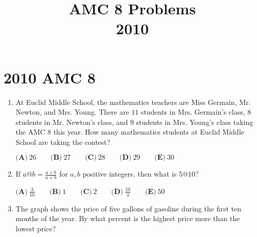 \documentclass{article}
\title{AMC 8 Problems \\ 2010}
\date{}
\begin{document}
\maketitle\thispagestyle{fancy}\newpage\section*{2010 AMC 8}\begin{enumerate}[label=\arabic*., itemsep=0.5em]\item At Euclid Middle School, the mathematics teachers are Miss Germain, Mr. Newton, and Mrs. Young. There are \(11\) students in Mrs. Germain's class, \(8\) students in Mr. Newton's class, and \(9\) students in Mrs. Young's class taking the AMC 8 this year. How many mathematics students at Euclid Middle School are taking the contest? 

\( \textbf{(A)}\ 26 \qquad\textbf{(B)}\ 27\qquad\textbf{(C)}\ 28\qquad\textbf{(D)}\ 29\qquad\textbf{(E)}\ 30 \)\par \vspace{0.5em}\item If \(a @ b = \frac{a\times b}{a+b}\) for \(a,b\) positive integers, then what is \(5 @ 10\)? 

\(\textbf{(A)}\ \frac{3}{10} \qquad\textbf{(B)}\ 1 \qquad\textbf{(C)}\ 2 \qquad\textbf{(D)}\ \frac{10}{3} \qquad\textbf{(E)}\ 50\)\par \vspace{0.5em}\item The graph shows the price of five gallons of gasoline during the first ten months of the year. By what percent is the highest price more than the lowest price?



\end{enumerate}
\end{document}
